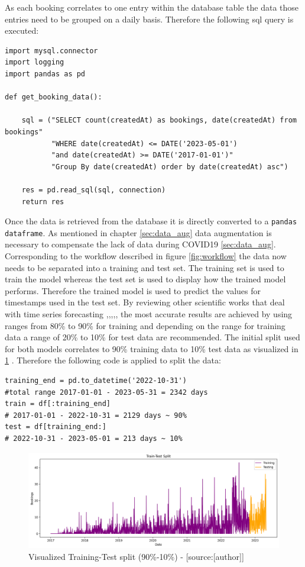 As each booking correlates to one entry within the database table the data those entries need to be grouped on a daily basis. Therefore the following sql query is executed: 
\begin{lstlisting}
import mysql.connector
import logging
import pandas as pd

def get_booking_data():

    sql = ("SELECT count(createdAt) as bookings, date(createdAt) from bookings"
           "WHERE date(createdAt) <= DATE('2023-05-01') 
           "and date(createdAt) >= DATE('2017-01-01')"
           "Group By date(createdAt) order by date(createdAt) asc")

    res = pd.read_sql(sql, connection)
    return res
\end{lstlisting}

Once the data is retrieved from the database it is directly converted to a \verb|pandas dataframe|. As mentioned in chapter \ref{sec:data_aug} data augmentation is necessary to compensate the lack of data during COVID19 \ref{sec:data_aug}. Corresponding to the workflow described in figure \ref{fig:workflow} the data now needs to be separated into a training and test set. The training set is used to train the model whereas the test set is used to display how the trained model performs. Therefore the trained model is used to predict the values for timestamps used in the test set. By reviewing other scientific works that deal with time series forecasting \cite{1d_cnn},\cite{cnn_vechicle},\cite{cnn_intro},\cite{lstm_overcome_rnn_problem},\cite{lstm_module},\cite{lstm_stock} the most accurate results are achieved by using ranges from 80\% to 90\% for training and depending on the range for training data a range of 20\% to 10\% for test data are recommended. The initial split used for both models correlates to 90\% training data to 10\% test data as visualized in \ref{fig:training_test} . Therefore the following code is applied to split the data:
\begin{lstlisting}
training_end = pd.to_datetime('2022-10-31')
#total range 2017-01-01 - 2023-05-31 = 2342 days
train = df[:training_end]
# 2017-01-01 - 2022-10-31 = 2129 days ~ 90%
test = df[training_end:]
# 2022-10-31 - 2023-05-01 = 213 days ~ 10%
\end{lstlisting}
\begin{figure}[H]
	\centering
		\includegraphics[width=14cm]{images/training_test}
	\caption{Visualized Training-Test split (90\%-10\%) - [source:[author]]}
	\label{fig:training_test}
\end{figure}
